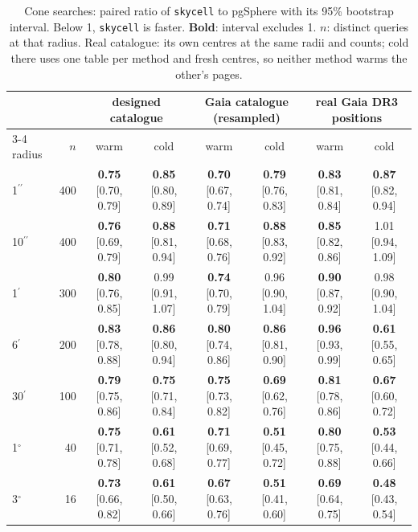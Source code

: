 \documentclass[preprint,12pt]{elsarticle}
\newcommand{\arcsec}{\ensuremath{^{\prime\prime}}}
\newcommand{\arcmin}{\ensuremath{^{\prime}}}
\newcommand{\degr}{\ensuremath{^{\circ}}}
\newenvironment{widetable}{\begin{table}}{\end{table}}
\begin{document}
\begin{widetable}
  \caption{Cone searches: paired ratio of \texttt{skycell} to pgSphere with its 95\%
    bootstrap interval. Below 1, \texttt{skycell} is faster. \textbf{Bold}: interval
    excludes 1. $n$: distinct queries at that radius. Real catalogue: its own centres at
    the same radii and counts; cold there uses one table per method and fresh centres,
    so neither method warms the other's pages.}
  \label{tab:cones}
  \centering
  \footnotesize
  \setlength{\tabcolsep}{4pt}
  \begin{tabular}{l r cc cc cc}
    \hline\hline
    & & \multicolumn{2}{c}{designed catalogue} & \multicolumn{2}{c}{Gaia catalogue (resampled)} & \multicolumn{2}{c}{real Gaia DR3 positions} \\
    \cline{3-4}\cline{5-6}\cline{7-8}
    radius & $n$ & warm & cold & warm & cold & warm & cold \\
    \hline
    1\arcsec  & 400 & \textbf{0.75} [0.70, 0.79] & \textbf{0.85} [0.80, 0.89] & \textbf{0.70} [0.67, 0.74] & \textbf{0.79} [0.76, 0.83] & \textbf{0.83} [0.81, 0.84] & \textbf{0.87} [0.82, 0.94] \\
    10\arcsec & 400 & \textbf{0.76} [0.69, 0.79] & \textbf{0.88} [0.81, 0.94] & \textbf{0.71} [0.68, 0.76] & \textbf{0.88} [0.83, 0.92] & \textbf{0.85} [0.82, 0.86] & 1.01 [0.94, 1.09] \\
    1\arcmin  & 300 & \textbf{0.80} [0.76, 0.85] & 0.99 [0.91, 1.07] & \textbf{0.74} [0.70, 0.79] & 0.96 [0.90, 1.04] & \textbf{0.90} [0.87, 0.92] & 0.98 [0.90, 1.04] \\
    6\arcmin  & 200 & \textbf{0.83} [0.78, 0.88] & \textbf{0.86} [0.80, 0.94] & \textbf{0.80} [0.74, 0.86] & \textbf{0.86} [0.81, 0.90] & \textbf{0.96} [0.93, 0.99] & \textbf{0.61} [0.55, 0.65] \\
    30\arcmin & 100 & \textbf{0.79} [0.75, 0.86] & \textbf{0.75} [0.71, 0.84] & \textbf{0.75} [0.73, 0.82] & \textbf{0.69} [0.62, 0.76] & \textbf{0.81} [0.78, 0.86] & \textbf{0.67} [0.60, 0.72] \\
    1\degr    &  40 & \textbf{0.75} [0.71, 0.78] & \textbf{0.61} [0.52, 0.68] & \textbf{0.71} [0.69, 0.77] & \textbf{0.51} [0.45, 0.72] & \textbf{0.80} [0.75, 0.88] & \textbf{0.53} [0.44, 0.66] \\
    3\degr    &  16 & \textbf{0.73} [0.66, 0.82] & \textbf{0.61} [0.50, 0.66] & \textbf{0.67} [0.63, 0.76] & \textbf{0.51} [0.41, 0.60] & \textbf{0.69} [0.64, 0.75] & \textbf{0.48} [0.43, 0.54] \\
    \hline
  \end{tabular}
\end{widetable}
\end{document}
